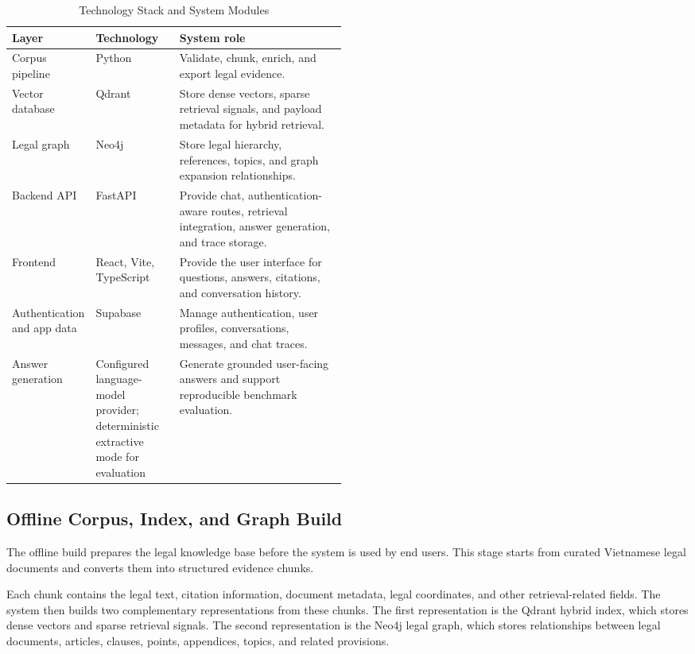 \begin{table}[H]
  \centering
  \caption{Technology Stack and System Modules}
  \label{tab:tech-stack-draft}
  \small
  \begin{tabularx}{\linewidth}{@{}L{0.24\linewidth}L{0.25\linewidth}Y@{}}
    \toprule
    Layer & Technology & System role \\
    \midrule
    Corpus pipeline & Python & Validate, chunk, enrich, and export legal evidence. \\
    Vector database & Qdrant & Store dense vectors, sparse retrieval signals, and payload metadata for hybrid retrieval. \\
    Legal graph & Neo4j & Store legal hierarchy, references, topics, and graph expansion relationships. \\
    Backend API & FastAPI & Provide chat, authentication-aware routes, retrieval integration, answer generation, and trace storage. \\
    Frontend & React, Vite, TypeScript & Provide the user interface for questions, answers, citations, and conversation history. \\
    Authentication and app data & Supabase & Manage authentication, user profiles, conversations, messages, and chat traces. \\
    Answer generation & Configured language-model provider; deterministic extractive mode for evaluation & Generate grounded user-facing answers and support reproducible benchmark evaluation. \\
    \bottomrule
  \end{tabularx}
\end{table}

\subsection{Offline Corpus, Index, and Graph Build}

The offline build prepares the legal knowledge base before the system is used by end users. This stage starts from curated Vietnamese legal documents and converts them into structured evidence chunks.

Each chunk contains the legal text, citation information, document metadata, legal coordinates, and other retrieval-related fields. The system then builds two complementary representations from these chunks. The first representation is the Qdrant hybrid index, which stores dense vectors and sparse retrieval signals. The second representation is the Neo4j legal graph, which stores relationships between legal documents, articles, clauses, points, appendices, topics, and related provisions.

